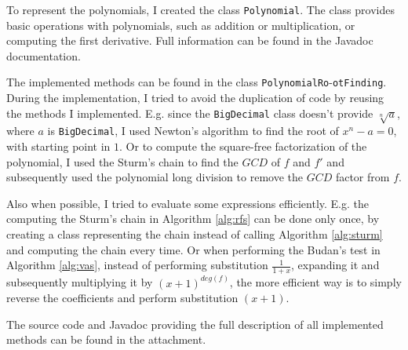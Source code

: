 \documentclass[
  digital, %
  notable,   %
  nolof,     %
  nolot,     %
	draft, %
]{fithesis3}
\begin{document}
To represent the polynomials, I created the class \texttt{Polynomial}. The class provides basic operations with polynomials, such as addition or multiplication, or computing the first derivative. Full information can be found in the Javadoc documentation.

The implemented methods can be found in the class \texttt{PolynomialRo}-\texttt{otFinding}. During the implementation, I tried to avoid the duplication of code by reusing the methods I implemented. E.g. since the \texttt{BigDecimal} class doesn't provide $\sqrt[n]{a}$, where $a$ is \texttt{BigDecimal}, I used Newton's algorithm to find the root of $x^{n}-a=0$, with starting point in $1$. Or to compute the square-free factorization of the polynomial, I used the Sturm's chain to find the $GCD$ of $f$ and $f'$ and subsequently used the polynomial long division to remove the $GCD$ factor from $f$.

Also when possible, I tried to evaluate some expressions efficiently. E.g. the computing the Sturm's chain in Algorithm \ref{alg:rfs} can be done only once, by creating a class representing the chain instead of calling Algorithm \ref{alg:sturm} and computing the chain every time. Or when performing the Budan's test in Algorithm \ref{alg:vas}, instead of performing substitution $\frac{1}{1+x}$, expanding it and subsequently multiplying it by $(x+1)^{deg(f)}$, the more efficient way is to simply reverse the coefficients and perform substitution $(x+1)$.

The source code and Javadoc providing the full description of all implemented methods can be found in the attachment.

%		
\end{document}
